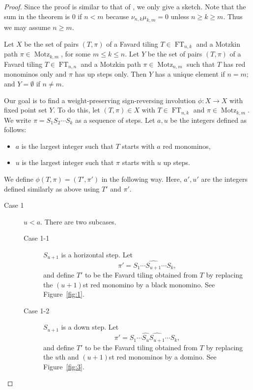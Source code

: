 \documentclass[oneside]{book}
\numberwithin{equation}{section}
\theoremstyle{definition}
\newcommand\Motz{\operatorname{Motz}}
\newcommand\FT{\operatorname{FT}}
\begin{document}
\begin{proof}
  Since the proof is similar to that of , we only
  give a sketch. Note that the sum in the theorem is \( 0 \) if
  \( n<m \) because \( \nu_{n,k}\mu_{k,m}=0 \) unless
  \( n\ge k\ge m \). Thus we may assume \( n\ge m \).

  Let \( X \) be the set of pairs \( (T,\pi) \) of a Favard tiling
  \( T\in \FT_{n,k} \) and a Motzkin path \( \pi\in \Motz_{k,m} \),
  for some \( m\le k\le n \). Let \( Y \) be the set of pairs
  \( (T,\pi) \) of a Favard tiling \( T\in \FT_{n,n} \) and a Motzkin
  path \( \pi\in \Motz_{n,m} \) such that \( T \) has red monominos
  only and \( \pi \) has up steps only. Then \( Y \) has a unique
  element if \( n=m \); and \( Y=\emptyset \) if \( n\ne m \).

  Our goal is to find a weight-preserving sign-reversing involution
  \( \phi: X \to X \) with fixed point set \( Y \). To do this, let
  \( (T,\pi)\in X \) with \( T\in \FT_{n,k} \) and
  \( \pi\in \Motz_{k,m} \). We write \( \pi=S_1S_2 \cdots S_{k} \) as
  a sequence of steps. Let \( a,u \) be the integers defined as
  follows:
 \begin{itemize}
 \item \( a \) is the largest integer such that \( T \)
   starts with \( a \) red monominos,
 \item \( u \) is the largest integer such that \( \pi \) starts with
   \( u \) up steps.
 \end{itemize}
 We define \( \phi(T,\pi)= (T',\pi') \) in the following way. Here,
 \( a',u' \) are the integers defined similarly as above using
 \( T' \) and \( \pi' \).
\begin{description}
\item[Case 1] \( u<a \). There are two
  subcases.
\begin{description}
\item[Case 1-1] \( S_{u+1} \) is a horizontal step. Let
  \[
    \pi' = S_1\cdots \widehat{S_{u+1}} \cdots S_{k},
  \]
and define $T'$ to be the Favard tiling obtained from $T$ by replacing
the \( (u+1) \)st red monomino by a black monomino. See
Figure~\ref{fig:1}.
\item[Case 1-2] $S_{u+1}$ is a down step. Let
  \[
    \pi' = S_1\cdots \widehat{S_{u}}\widehat{S_{u+1}} \cdots S_k,
  \]
and define $T'$ to be the Favard tiling obtained from $T$ by replacing
the \( u \)th and \( (u+1) \)st red monominos by a domino. See
Figure~\ref{fig:3}.
\end{description}


\end{description}
\end{proof}
\end{document}
